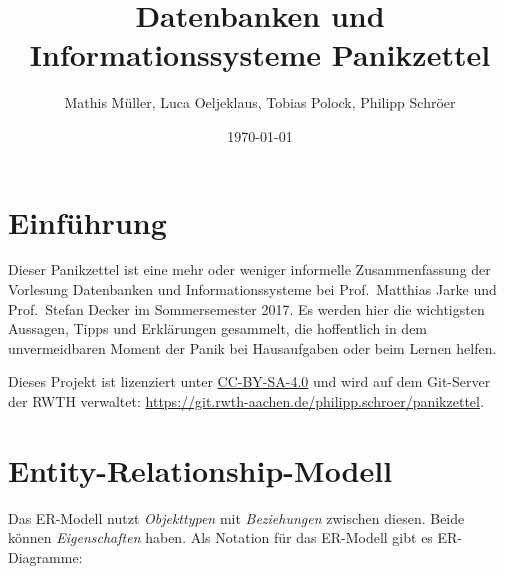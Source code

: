 \documentclass[a4paper,parskip=half*,DIV=15,fontsize=11pt]{scrartcl}
\title{Datenbanken und Informationssysteme Panikzettel}
\author{Mathis Müller, Luca Oeljeklaus, Tobias Polock, Philipp Schröer}
\date{\today}
\begin{document}
\maketitle

\setcounter{tocdepth}{2}
\tableofcontents

\section{Einführung}

Dieser Panikzettel ist eine mehr oder weniger informelle Zusammenfassung der Vorlesung Datenbanken und Informationssysteme bei Prof.\ Matthias Jarke und Prof.\ Stefan Decker im Sommersemester 2017. Es werden hier die wichtigsten Aussagen, Tipps und Erklärungen gesammelt, die hoffentlich in dem unvermeidbaren Moment der Panik bei Hausaufgaben oder beim Lernen helfen.

Dieses Projekt ist lizenziert unter \href{https://creativecommons.org/licenses/by-sa/4.0/}{CC-BY-SA-4.0} und wird auf dem Git-Server der RWTH verwaltet: \url{https://git.rwth-aachen.de/philipp.schroer/panikzettel}.

\section{Entity-Relationship-Modell}

Das ER-Modell nutzt \emph{Objekttypen} mit \emph{Beziehungen} zwischen diesen. Beide können \emph{Eigenschaften} haben. Als Notation für das ER-Modell gibt es ER-Diagramme:

\begin{center}
\end{center}
\end{document}
